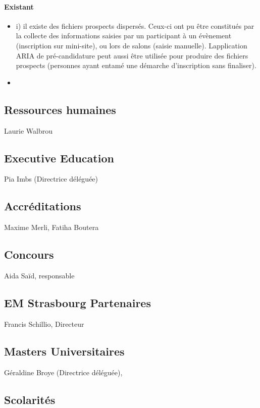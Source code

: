 \documentclass{book}
\begin{document}
\paragraph{Existant}
\begin{itemize}
\item i) il existe des fichiers prospects dispersés. Ceux-ci ont pu être 
      constitués par la collecte des informations saisies par un participant
      à un évènement (inscription sur mini-site), ou lors de salons (saisie
	manuelle). Lapplication ARIA de pré-candidature peut aussi être utilisée
	pour produire des fichiers prospects (personnes ayant entamé une démarche
	d'inscription sans finaliser).

\item 
\end{itemize}





\subsection{Ressources humaines}
Laurie Walbrou

\subsection{Executive Education }
Pia Imbs (Directrice déléguée)

\subsection{Accréditations}
Maxime Merli, Fatiha Boutera

\subsection{Concours }
Aida Saïd, responsable

\subsection{EM Strasbourg Partenaires }
Francis Schillio, Directeur 

\subsection{Masters Universitaires}
Géraldine Broye (Directrice déléguée),

 
\subsection{Scolarités}
\end{document}
